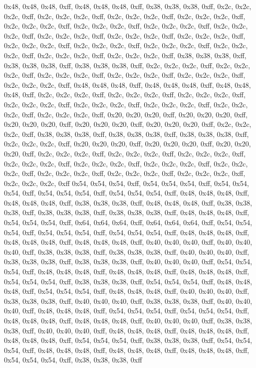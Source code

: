 0x48, 0x48, 0x48, 0xff, 0x48, 0x48, 0x48, 0xff, 0x38, 0x38, 0x38, 0xff, 0x2c, 0x2c, 0x2c, 0xff, 0x2c, 0x2c, 0x2c, 0xff, 0x2c, 0x2c, 0x2c, 0xff, 0x2c, 0x2c, 0x2c, 0xff, 0x2c, 0x2c, 0x2c, 0xff, 0x2c, 0x2c, 0x2c, 0xff, 0x2c, 0x2c, 0x2c, 0xff, 0x2c, 0x2c, 0x2c, 0xff, 0x2c, 0x2c, 0x2c, 0xff, 0x2c, 0x2c, 0x2c, 0xff, 0x2c, 0x2c, 0x2c, 0xff, 0x2c, 0x2c, 0x2c, 0xff, 0x2c, 0x2c, 0x2c, 0xff, 0x2c, 0x2c, 0x2c, 0xff, 0x2c, 0x2c, 0x2c, 0xff, 0x2c, 0x2c, 0x2c, 0xff, 0x2c, 0x2c, 0x2c, 0xff, 0x38, 0x38, 0x38, 0xff, 0x38, 0x38, 0x38, 0xff, 0x38, 0x38, 0x38, 0xff, 0x2c, 0x2c, 0x2c, 0xff, 0x2c, 0x2c, 0x2c, 0xff, 0x2c, 0x2c, 0x2c, 0xff, 0x2c, 0x2c, 0x2c, 0xff, 0x2c, 0x2c, 0x2c, 0xff, 0x2c, 0x2c, 0x2c, 0xff, 0x48, 0x48, 0x48, 0xff, 0x48, 0x48, 0x48, 0xff, 0x48, 0x48, 0x48, 0xff, 0x2c, 0x2c, 0x2c, 0xff, 0x2c, 0x2c, 0x2c, 0xff, 0x2c, 0x2c, 0x2c, 0xff, 0x2c, 0x2c, 0x2c, 0xff, 0x2c, 0x2c, 0x2c, 0xff, 0x2c, 0x2c, 0x2c, 0xff, 0x2c, 0x2c, 0x2c, 0xff, 0x2c, 0x2c, 0x2c, 0xff, 0x20, 0x20, 0x20, 0xff, 0x20, 0x20, 0x20, 0xff, 0x20, 0x20, 0x20, 0xff, 0x20, 0x20, 0x20, 0xff, 0x20, 0x20, 0x20, 0xff, 0x2c, 0x2c, 0x2c, 0xff, 0x38, 0x38, 0x38, 0xff, 0x38, 0x38, 0x38, 0xff, 0x38, 0x38, 0x38, 0xff, 0x2c, 0x2c, 0x2c, 0xff, 0x20, 0x20, 0x20, 0xff, 0x20, 0x20, 0x20, 0xff, 0x20, 0x20, 0x20, 0xff, 0x2c, 0x2c, 0x2c, 0xff, 0x2c, 0x2c, 0x2c, 0xff, 0x2c, 0x2c, 0x2c, 0xff, 0x2c, 0x2c, 0x2c, 0xff, 0x2c, 0x2c, 0x2c, 0xff, 0x2c, 0x2c, 0x2c, 0xff, 0x2c, 0x2c, 0x2c, 0xff, 0x2c, 0x2c, 0x2c, 0xff, 0x2c, 0x2c, 0x2c, 0xff, 0x2c, 0x2c, 0x2c, 0xff, 0x2c, 0x2c, 0x2c, 0xff
0x54, 0x54, 0x54, 0xff, 0x54, 0x54, 0x54, 0xff, 0x54, 0x54, 0x54, 0xff, 0x54, 0x54, 0x54, 0xff, 0x54, 0x54, 0x54, 0xff, 0x48, 0x48, 0x48, 0xff, 0x48, 0x48, 0x48, 0xff, 0x38, 0x38, 0x38, 0xff, 0x48, 0x48, 0x48, 0xff, 0x38, 0x38, 0x38, 0xff, 0x38, 0x38, 0x38, 0xff, 0x38, 0x38, 0x38, 0xff, 0x48, 0x48, 0x48, 0xff, 0x54, 0x54, 0x54, 0xff, 0x64, 0x64, 0x64, 0xff, 0x64, 0x64, 0x64, 0xff, 0x54, 0x54, 0x54, 0xff, 0x54, 0x54, 0x54, 0xff, 0x54, 0x54, 0x54, 0xff, 0x48, 0x48, 0x48, 0xff, 0x48, 0x48, 0x48, 0xff, 0x48, 0x48, 0x48, 0xff, 0x40, 0x40, 0x40, 0xff, 0x40, 0x40, 0x40, 0xff, 0x38, 0x38, 0x38, 0xff, 0x38, 0x38, 0x38, 0xff, 0x40, 0x40, 0x40, 0xff, 0x38, 0x38, 0x38, 0xff, 0x38, 0x38, 0x38, 0xff, 0x40, 0x40, 0x40, 0xff, 0x54, 0x54, 0x54, 0xff, 0x48, 0x48, 0x48, 0xff, 0x48, 0x48, 0x48, 0xff, 0x48, 0x48, 0x48, 0xff, 0x54, 0x54, 0x54, 0xff, 0x38, 0x38, 0x38, 0xff, 0x54, 0x54, 0x54, 0xff, 0x48, 0x48, 0x48, 0xff, 0x54, 0x54, 0x54, 0xff, 0x48, 0x48, 0x48, 0xff, 0x40, 0x40, 0x40, 0xff, 0x38, 0x38, 0x38, 0xff, 0x40, 0x40, 0x40, 0xff, 0x38, 0x38, 0x38, 0xff, 0x40, 0x40, 0x40, 0xff, 0x48, 0x48, 0x48, 0xff, 0x54, 0x54, 0x54, 0xff, 0x54, 0x54, 0x54, 0xff, 0x48, 0x48, 0x48, 0xff, 0x48, 0x48, 0x48, 0xff, 0x40, 0x40, 0x40, 0xff, 0x38, 0x38, 0x38, 0xff, 0x40, 0x40, 0x40, 0xff, 0x48, 0x48, 0x48, 0xff, 0x48, 0x48, 0x48, 0xff, 0x48, 0x48, 0x48, 0xff, 0x54, 0x54, 0x54, 0xff, 0x38, 0x38, 0x38, 0xff, 0x54, 0x54, 0x54, 0xff, 0x48, 0x48, 0x48, 0xff, 0x48, 0x48, 0x48, 0xff, 0x48, 0x48, 0x48, 0xff, 0x54, 0x54, 0x54, 0xff, 0x38, 0x38, 0x38, 0xff
